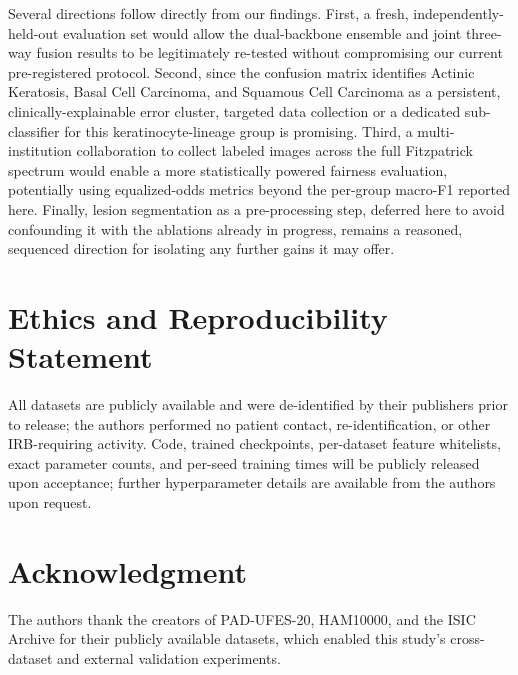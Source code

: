 \documentclass[conference]{IEEEtran}
\begin{document}
Several directions follow directly from our findings. First, a fresh, independently-held-out evaluation set would allow the dual-backbone ensemble and joint three-way fusion results to be legitimately re-tested without compromising our current pre-registered protocol. Second, since the confusion matrix identifies Actinic Keratosis, Basal Cell Carcinoma, and Squamous Cell Carcinoma as a persistent, clinically-explainable error cluster, targeted data collection or a dedicated sub-classifier for this keratinocyte-lineage group is promising. Third, a multi-institution collaboration to collect labeled images across the full Fitzpatrick spectrum would enable a more statistically powered fairness evaluation, potentially using equalized-odds metrics beyond the per-group macro-F1 reported here. Finally, lesion segmentation as a pre-processing step, deferred here to avoid confounding it with the ablations already in progress, remains a reasoned, sequenced direction for isolating any further gains it may offer.

\section*{Ethics and Reproducibility Statement}
All datasets are publicly available and were de-identified by their publishers prior to release; the authors performed no patient contact, re-identification, or other IRB-requiring activity. Code, trained checkpoints, per-dataset feature whitelists, exact parameter counts, and per-seed training times will be publicly released upon acceptance; further hyperparameter details are available from the authors upon request.

\section*{Acknowledgment}
The authors thank the creators of PAD-UFES-20, HAM10000, and the ISIC Archive for their publicly available datasets, which enabled this study's cross-dataset and external validation experiments.
\end{document}
